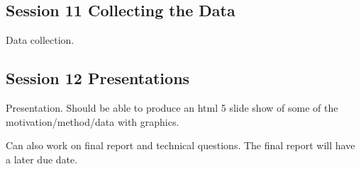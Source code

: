 \documentclass{article}
\begin{document}
\subsection{Session 11 Collecting the Data}
\label{sec:orgf3a340b}
Data collection.
\subsection{Session 12 Presentations}
\label{sec:orga547fed}
Presentation. Should be able to produce an html 5 slide show of some of the motivation/method/data with graphics.

Can also work on final report and technical questions. The final report will have a later due date. 
\end{document}
